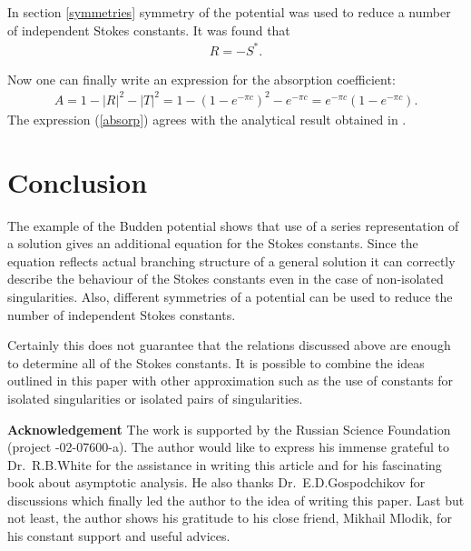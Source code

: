 \documentclass[aps,prl,preprint,superscriptaddress]{revtex4}
\begin{document}
In section \ref{symmetries} symmetry of the potential was used to reduce a number of independent Stokes constants. It was found that
\begin{eqnarray}
R=-S^*. 
\end{eqnarray}

Now one can finally write an expression for the absorption coefficient:
\begin{eqnarray}
A=1-|R|^2-|T|^2=1-(1-e^{-\pi c})^2-e^{-\pi c}=e^{-\pi c}(1-e^{-\pi c}).    \label{absorp}
\end{eqnarray}
The expression (\ref{absorp}) agrees with the analytical result obtained in \cite[p 234]{rwbook}.

\section{Conclusion \label{con}}
The example of the Budden potential shows that use of a series representation of a solution gives an additional equation for the Stokes constants. Since the equation reflects actual branching structure of a general solution it can correctly describe the behaviour of the Stokes constants even in the case of non-isolated singularities. Also, different symmetries of a potential can be used to reduce the number of independent Stokes constants.

Certainly this does not guarantee that the relations discussed above are enough to determine all of the Stokes constants. It is possible to combine the ideas outlined in this paper with other approximation such as the use of constants for isolated singularities or isolated pairs of singularities.

\textbf{Acknowledgement}
The work is supported by the Russian Science Foundation (project -02-07600-a). The author would like to express his immense grateful to Dr.~R.B.White for the assistance in writing this article and for his fascinating book about asymptotic analysis. He also thanks Dr.~E.D.Gospodchikov for discussions which finally led the author to the idea of writing this paper. Last but not least, the author shows his gratitude to his close friend, Mikhail Mlodik, for his constant support and useful advices.
\end{document}
